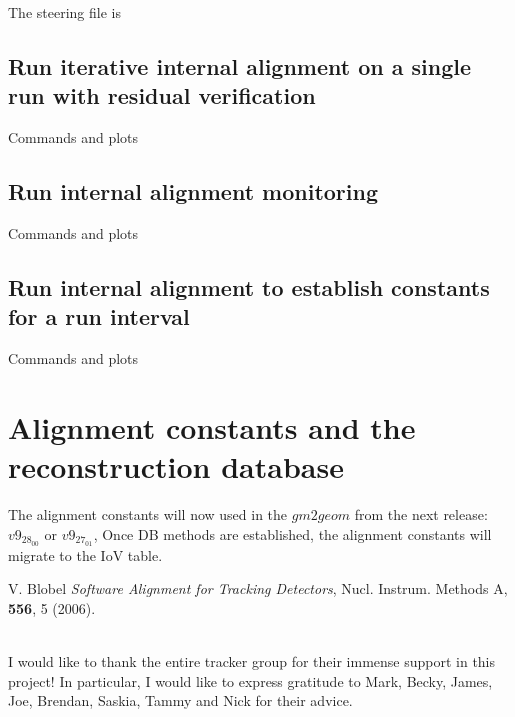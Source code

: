 \documentclass[12pt]{article}
\begin{document}
The steering file is


\subsection{Run iterative internal alignment on a single run with residual verification}

Commands and plots 

\subsection{Run internal alignment monitoring}
Commands and plots 
\subsection{Run internal alignment to establish constants for a run interval}
Commands and plots 

\section{Alignment constants and the reconstruction database}
The alignment constants will now used in the $gm2geom$ from the next release: $v9_28_00$ or $v9_27_01$, Once DB methods are established, the alignment constants will migrate to the IoV table. 

\begin{thebibliography}{99}

 V. Blobel \textit{Software Alignment for Tracking Detectors}, Nucl. Instrum. Methods A, \textbf{556}, 5 (2006).

\end{thebibliography}

\def\Acknowledgements{
\setlength{\parskip}{0.3cm}\setlength{\parindent}{0.0cm}
     \bigskip\bigskip      {\Large {\bf Acknowledgements}} \bigskip}
\def\speaker#1{{\bf #1:}\ }
\def\endAcknowledgements{}

\Acknowledgements \\
I would like to thank the entire tracker group for their immense support in this project! In particular, I would like to express gratitude to Mark, Becky, James, Joe, Brendan, Saskia, Tammy and Nick for their advice.
\endAcknowledgements
 
\end{document}
